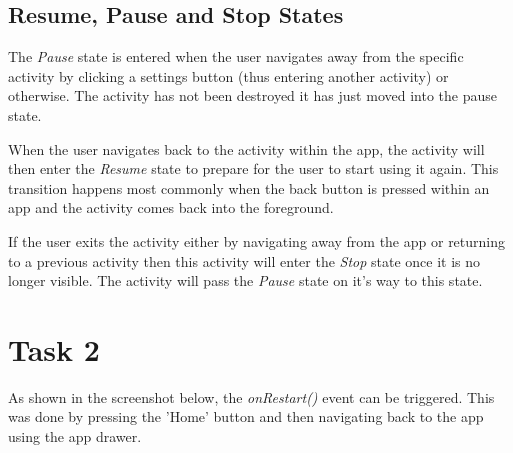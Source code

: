 \documentclass[11pt,english,numbers=endperiod,parskip=half]{scrartcl}
\begin{document}
\subsection{Resume, Pause and Stop States}
The \textit{Pause} state is entered when the user navigates away from the specific activity by clicking a settings button (thus entering another activity) or otherwise. The activity has not been destroyed it has just moved into the pause state.

When the user navigates back to the activity within the app, the activity will then enter the \textit{Resume} state to prepare for the user to start using it again. This transition happens most commonly when the back button is pressed within an app and the activity comes back into the foreground.

If the user exits the activity either by navigating away from the app or returning to a previous activity then this activity will enter the \textit{Stop} state once it is no longer visible. The activity will pass the \textit{Pause} state on it's way to this state.

\section{Task 2}
As shown in the screenshot below, the \textit{onRestart()} event can be triggered. This was done by pressing the 'Home' button and then navigating back to the app using the app drawer.

\\
\bigskip
\end{document}

